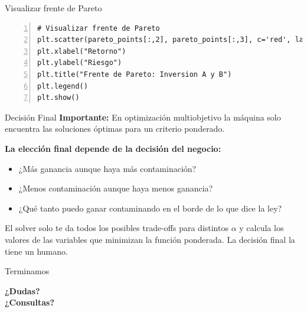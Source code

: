 \documentclass{beamer}
\begin{document}
\begin{frame}[fragile]{Visualizar frente de Pareto}
    \begin{lstlisting}[numbers=left, numbersep=5pt]
# Visualizar frente de Pareto
plt.scatter(pareto_points[:,2], pareto_points[:,3], c='red', label='Frente de Pareto')
plt.xlabel("Retorno")
plt.ylabel("Riesgo")
plt.title("Frente de Pareto: Inversion A y B")
plt.legend()
plt.show()
    \end{lstlisting}
\end{frame}

\begin{frame}{Decisión Final}
    \textbf{Importante:} En optimización multiobjetivo la máquina solo encuentra las soluciones óptimas para un criterio ponderado.
    
    \vspace{0.5cm}
    
    \textbf{La elección final depende de la decisión del negocio:}
    \begin{itemize}
        \item ¿Más ganancia aunque haya más contaminación?
        \item ¿Menos contaminación aunque haya menos ganancia?
        \item ¿Qué tanto puedo ganar contaminando en el borde de lo que dice la ley?
    \end{itemize}
    
    \vspace{0.5cm}

    El solver solo te da todos los posibles trade-offs para distintos $\alpha$ y calcula los valores de las variables que minimizan la función ponderada. La decisión final la tiene un humano.
    
\end{frame}

\begin{frame}{Terminamos}
    \begin{center}
        \Large{\textbf{¿Dudas?\\¿Consultas?}}
    \end{center}
\end{frame}
\end{document}
